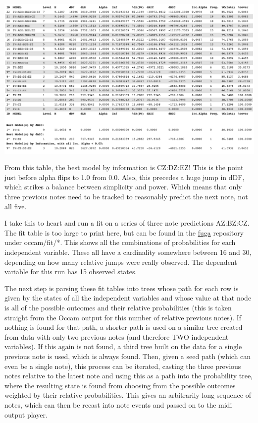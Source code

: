 \documentclass[11pt]{article}
\begin{document}
\begin{center}
\includegraphics[scale=0.45]{five.png}
\end{center}

From this table, the best model by information is CZ:DZ:EZ!  This is the point just before alpha flips to 1.0 from 0.0.  Also, this precedes a huge jump in dDF, which strikes a balance between simplicity and power.  Which means that only three previous notes need to be tracked to reasonably predict the next note, not all five.  

I take this to heart and run a fit on a series of three note predictions AZ:BZ:CZ.  The fit table is too large to print here, but can be found in the \href{http://github.com/prismofeverything/fuga}{fuga} repository under occam/fit/*.  This shows all the combinations of probabilities for each independent variable.  These all have a cardinality somewhere between 16 and 30, depending on how many relative jumps were really observed.  The dependent variable for this run has 15 observed states.  

The next step is parsing these fit tables into trees whose path for each row is given by the states of all the independent variables and whose value at that node is all of the possible outcomes and their relative probabilities (this is taken straight from the Occam output for this number of relative previous notes).  If nothing is found for that path, a shorter path is used on a similar tree created from data with only two previous notes (and therefore TWO independent variables).  If this again is not found, a third tree built on the data for a single previous note is used, which is always found.  Then, given a seed path (which can even be a single note), this process can be iterated, casting the three previous notes relative to the latest note and using this as a path into the probability tree, where the resulting state is found from choosing from the possible outcomes weighted by their relative probabilities.  This gives an arbitrarily long sequence of notes, which can then be recast into note events and passed on to the midi output player.  
\end{document}

